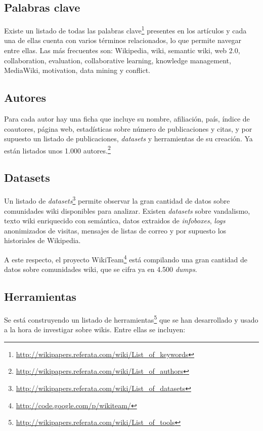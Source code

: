 \documentclass[11pt,twocolumn]{article}
\begin{document}
\subsection{Palabras clave}
Existe un listado de todas las palabras clave\footnote{\href{http://wikipapers.referata.com/wiki/List_of_keywords}{http://wikipapers.referata.com/wiki/List\_of\_keywords}} presentes en los artículos y cada una de ellas cuenta con varios términos relacionados, lo que permite navegar entre ellas. Las más frecuentes son: Wikipedia, wiki, semantic wiki, web 2.0, collaboration, evaluation, collaborative learning, knowledge management, MediaWiki, motivation, data mining y conflict. 

\subsection{Autores}
Para cada autor hay una ficha que incluye su nombre, afiliación, país, índice de coautores, página web, estadísticas sobre número de publicaciones y citas, y por supuesto un listado de publicaciones, \emph{datasets} y herramientas de su creación. Ya están listados unos 1.000 autores.\footnote{\href{http://wikipapers.referata.com/wiki/List_of_authors}{http://wikipapers.referata.com/wiki/List\_of\_authors}}

\subsection{Datasets}
Un listado de \emph{datasets}\footnote{\href{http://wikipapers.referata.com/wiki/List_of_datasets}{http://wikipapers.referata.com/wiki/List\_of\_datasets}} permite observar la gran cantidad de datos sobre comunidades wiki disponibles para analizar. Existen \emph{datasets} sobre vandalismo, texto wiki enriquecido con semántica, datos extraidos de \emph{infoboxes}, \emph{logs} anonimizados de visitas, mensajes de listas de correo y por supuesto los historiales de Wikipedia.

A este respecto, el proyecto WikiTeam\footnote{\href{http://code.google.com/p/wikiteam/}{http://code.google.com/p/wikiteam/}} está compilando una gran cantidad de datos sobre comunidades wiki, que se cifra ya en 4.500 \emph{dumps}.

\subsection{Herramientas}
Se está construyendo un listado de herramientas\footnote{\href{http://wikipapers.referata.com/wiki/List_of_tools}{http://wikipapers.referata.com/wiki/List\_of\_tools}} que se han desarrollado y usado a la hora de investigar sobre wikis. Entre ellas se incluyen:
\end{document}
